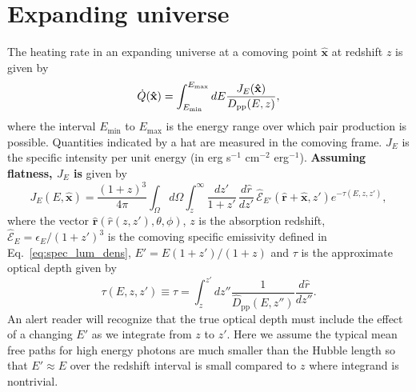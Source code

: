 \documentclass[numberedappendix]{emulateapj}
\newcommand\ALc[1]{{\color{red} \bf #1}} %
\begin{document}
\section{Expanding universe}\label{sec:window_exp}

The heating rate in an expanding universe at a comoving point $\mathbf{\hat{x}}$ at redshift $z$ is given by
\begin{equation}
  \dot{Q}(\mathbf{\hat{x}})= \int_{E_{\rm min}}^{E_{\rm max}} dE \frac{J_E(\mathbf{\hat{x}})}{D_{\mathrm{pp}}(E, z)},
\end{equation}
where the interval $E_{\mathrm{min}}$ to $E_{\mathrm{max}}$ is the energy range over which pair
production is possible. Quantities indicated by a hat are measured in the
comoving frame.
$J_E$ is the specific intensity per unit energy (in erg s$^{-1}$ cm$^{-2}$ erg$^{-1}$). \ALc{Assuming flatness, $J_E$ is} given by
\begin{equation}\label{eq:expanding J}
  J_E(E, \mathbf{\hat{x}}) = \frac {(1 + z)^3} {4\pi} \int_{\Omega} d\Omega \int_z^{\infty} \frac{d z'}{1+z'}\,\frac{d\hat{r}}{dz'}\, {\hat{\mathcal{E}}_{E'}(\mathbf{\hat{r}}+\mathbf{\hat{x}}, z')}e^{-\tau(E,z,z')},
\end{equation}
where the vector $\mathbf{\hat{r}}(\hat{r}(z,z'), \theta, \phi)$, $z$ is the absorption redshift, $\hat{\mathcal{E}}_E = \epsilon_E/(1+z')^3$ is the comoving specific emissivity defined in Eq.~\eqref{eq:spec_lum_dens}, $E' = E (1+z')/(1+z)$ and $\tau$ is the approximate optical depth given by
\begin{equation}
\label{eq:tau}
\tau(E,z,z')\equiv \tau=\int_z^{z'}dz''\frac{1}{\hat D_{\mathrm{pp}}(E,z'')}\frac{d\hat r}{dz''}.
\end{equation}
An alert reader will recognize that the true optical depth must include the effect of a changing $E'$ as we integrate from $z$ to $z'$.  Here we assume the typical mean free paths for high energy photons are much smaller than the Hubble length so that $E' \approx E$ over the redshift interval is small compared to $z$  where integrand is nontrivial.  
\end{document}
